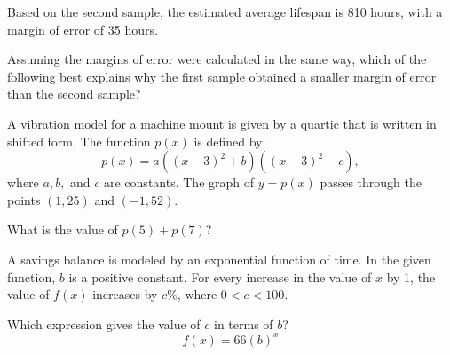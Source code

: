 Based on the second sample, the estimated average lifespan is 810 hours, with a margin of error of 35 hours.

Assuming the margins of error were calculated in the same way, which of the following best explains why the first sample obtained a smaller margin of error than the second sample?

\vspace{0.75em}


\vspace{2em}
\newpage

\noindent\markforreview
\vspace{1em}

A vibration model for a machine mount is given by a quartic that is written in shifted form. The function \(p(x)\) is defined by:
\[
p(x) = a((x - 3)^2 + b)((x - 3)^2 - c),
\]
where \(a, b,\) and \(c\) are constants. The graph of \(y = p(x)\) passes through the points \((1, 25)\) and \((-1, 52)\).

What is the value of \(p(5) + p(7)\)?

\vspace{0.75em}


\vspace{2em}
\newpage

\noindent\markforreview
\vspace{1em}

A savings balance is modeled by an exponential function of time. In the given function, \(b\) is a positive constant. For every increase in the value of \(x\) by 1, the value of \(f(x)\) increases by \(c\%\), where \(0 < c < 100\).

Which expression gives the value of \(c\) in terms of \(b\)?
\[
f(x) = 66(b)^x
\]

\vspace{0.75em}


\vspace{2em}
\newpage

